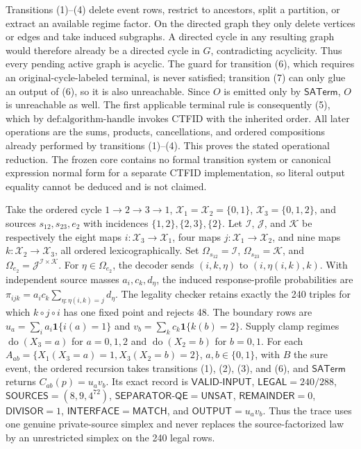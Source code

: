 Transitions (1)--(4) delete event rows, restrict to ancestors, split a partition, or extract an available regime factor.  On the directed graph they only delete vertices or edges and take induced subgraphs.  A directed cycle in any resulting graph would therefore already be a directed cycle in \(G\), contradicting acyclicity.  Thus every pending active graph is acyclic.  The guard for transition (6), which requires an original-cycle-labeled terminal, is never satisfied; transition (7) can only glue an output of (6), so it is also unreachable.  Since \(O\) is emitted only by \(\mathsf{SATerm}\), \(O\) is unreachable as well.  The first applicable terminal rule is consequently (5), which by \(\text{def:algorithm-handle}\) invokes CTFID with the inherited order.  All later operations are the sums, products, cancellations, and ordered compositions already performed by transitions (1)--(4).  This proves the stated operational reduction.  The frozen core contains no formal transition system or canonical expression normal form for a separate CTFID implementation, so literal output equality cannot be deduced and is not claimed.

Take the ordered cycle \(1\to2\to3\to1\), \(\mathcal X_1=\mathcal X_2=\{0,1\}\), \(\mathcal X_3=\{0,1,2\}\), and sources \(s_{12},s_{23},e_2\) with incidences \(\{1,2\},\{2,3\},\{2\}\).  Let \(\mathcal I\), \(\mathcal J\), and \(\mathcal K\) be respectively the eight maps \(i:\mathcal X_3\to\mathcal X_1\), four maps \(j:\mathcal X_1\to\mathcal X_2\), and nine maps \(k:\mathcal X_2\to\mathcal X_3\), all ordered lexicographically.  Set \(\Omega_{s_{12}}=\mathcal I\), \(\Omega_{s_{23}}=\mathcal K\), and \(\Omega_{e_2}=\mathcal J^{\mathcal I\times\mathcal K}\).  For \(\eta\in\Omega_{e_2}\), the decoder sends \((i,k,\eta)\) to \((i,\eta(i,k),k)\).  With independent source masses \(a_i,c_k,d_\eta\), the induced response-profile probabilities are \(\pi_{ijk}=a_ic_k\sum_{\eta:\eta(i,k)=j}d_\eta\).  The legality checker retains exactly the 240 triples for which \(k\circ j\circ i\) has one fixed point and rejects 48.  The boundary rows are \(u_a=\sum_i a_i\mathbf1\{i(a)=1\}\) and \(v_b=\sum_k c_k\mathbf1\{k(b)=2\}\).  Supply clamp regimes \(\operatorname{do}(X_3=a)\) for \(a=0,1,2\) and \(\operatorname{do}(X_2=b)\) for \(b=0,1\).  For each \(A_{ab}=\{X_1(X_3=a)=1,X_3(X_2=b)=2\}\), \(a,b\in\{0,1\}\), with \(B\) the sure event, the ordered recursion takes transitions (1), (2), (3), and (6), and \(\mathsf{SATerm}\) returns \(C_{ab}(p)=u_av_b\).  Its exact record is \(\mathsf{VALID\mbox{-}INPUT}\), \(\mathsf{LEGAL}=240/288\), \(\mathsf{SOURCES}=(8,9,4^{72})\), \(\mathsf{SEPARATOR\mbox{-}QE}=\mathsf{UNSAT}\), \(\mathsf{REMAINDER}=0\), \(\mathsf{DIVISOR}=1\), \(\mathsf{INTERFACE}=\mathsf{MATCH}\), and \(\mathsf{OUTPUT}=u_av_b\).  Thus the trace uses one genuine private-source simplex and never replaces the source-factorized law by an unrestricted simplex on the 240 legal rows.

